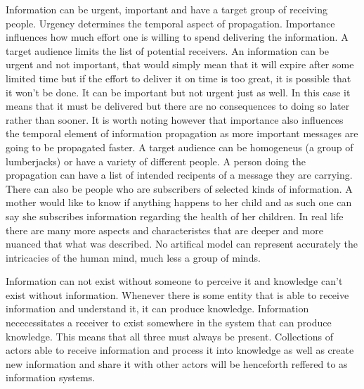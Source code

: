 Information can be urgent, important and have a target group of receiving people.
Urgency determines the temporal aspect of propagation.
Importance influences how much effort one is willing to spend delivering the information.
A target audience limits the list of potential receivers.
An information can be urgent and not important, that would simply mean that it will expire after some limited time but if the effort to deliver it on time is too great, it is possible that it won't be done.
It can be important but not urgent just as well.
In this case it means that it must be delivered but there are no consequences to doing so later rather than sooner.
It is worth noting however that importance also influences the temporal element of information propagation as more important messages are going to be propagated faster.
A target audience can be homogeneus (a group of lumberjacks) or have a variety of different people.
A person doing the propagation can have a list of intended recipents of a message they are carrying.
There can also be people who are subscribers of selected kinds of information.
A mother would like to know if anything happens to her child and as such one can say she subscribes information regarding the health of her children.
In real life there are many more aspects and characteristcs that are deeper and more nuanced that what was described.
No artifical model can represent accurately the intricacies of the human mind, much less a group of minds.

Information can not exist without someone to perceive it and knowledge can't exist without information.
Whenever there is some entity that is able to receive information and understand it, it can produce knowledge.
Information nececessitates a receiver to exist somewhere in the system that can produce knowledge.
This means that all three must always be present.
Collections of actors able to receive information and process it into knowledge as well as create new information and share it with other actors will be henceforth reffered to as information systems.

